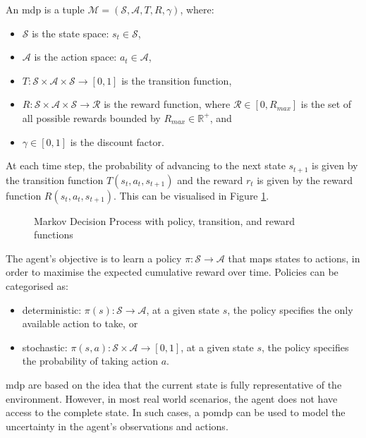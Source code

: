 \begin{definition}
    An \acrshort{mdp} is a tuple $\mathcal{M} = \left(\mathcal{S}, \mathcal{A}, T, R, \gamma\right)$, where:
    \begin{itemize}
        \item $\mathcal{S}$ is the state space: $s_t \in \mathcal{S}$,
        \item $\mathcal{A}$ is the action space: $a_t \in \mathcal{A}$,
        \item $T: \mathcal{S} \times \mathcal{A} \times \mathcal{S} \rightarrow [0, 1]$ is the transition function,
        \item $R: \mathcal{S} \times \mathcal{A} \times \mathcal{S} \rightarrow \mathcal{R}$ is the reward function, where $\mathcal{R} \in \left[0, R_{max}\right]$ is the set of all possible rewards bounded by $R_{max} \in \mathbb{R}^+$, and
        \item $\gamma \in [0, 1]$ is the discount factor.
    \end{itemize}
    
\end{definition}

At each time step, the probability of advancing to the next state $s_{t+1}$ is given by the transition function $T(s_t, a_t, s_{t+1})$ and the reward $r_t$ is given by the reward function $R(s_t, a_t, s_{t+1})$. This can be visualised in Figure \ref{fig:mdp}.

\begin{figure}[ht]
    \centering
    
    \caption{Markov Decision Process with policy, transition, and reward functions}
    \label{fig:mdp}
\end{figure}

The agent's objective is to learn a policy $\pi: \mathcal{S} \rightarrow \mathcal{A}$ that maps states to actions, in order to maximise the expected cumulative reward over time. Policies can be categorised as:
\begin{itemize}
    \item deterministic: $\pi(s) : \mathcal{S} \to \mathcal{A}$, at a given state $s$, the policy specifies the only available action to take, or
    \item stochastic: $\pi(s, a) : \mathcal{S} \times \mathcal{A} \to [0, 1]$, at a given state $s$, the policy specifies the probability of taking action $a$.
\end{itemize}

\acrlong{mdp} are based on the idea that the current state is fully representative of the environment. However, in most real world scenarios, the agent does not have access to the complete state. In such cases, a \acrfull{pomdp} can be used to model the uncertainty in the agent's observations and actions.


